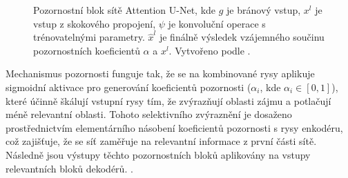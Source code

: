 \begin{figure}[H]
\caption[Pozornostní blok sítě Attention U-Net]{Pozornostní blok sítě Attention U-Net, kde $g$ je bránový vstup, $x^l$ je vstup z skokového propojení, $\psi$ je konvoluční operace s trénovatelnými parametry. $\hat{x}^l$ je finálně výsledek vzájemného součinu pozornostních koeficientů $\alpha$ a $x^l$. Vytvořeno podle \cite{attentionunet}. }
\end{figure}

Mechanismus pozornosti funguje tak, že se na kombinované rysy aplikuje sigmoidní aktivace pro generování koeficientů pozornosti (\(\alpha_i\), kde \(\alpha_i \in [0, 1]\)), které účinně škálují vstupní rysy tím, že zvýrazňují oblasti zájmu a potlačují méně relevantní oblasti. Tohoto selektivního zvýraznění je dosaženo prostřednictvím elementárního násobení koeficientů pozornosti s rysy enkodéru, což zajišťuje, že se síť zaměřuje na relevantní informace z první části sítě. Následně jsou výstupy těchto pozornostních bloků aplikovány na vstupy relevantních bloků dekodérů. \cite{attentionunet}.

\endinput